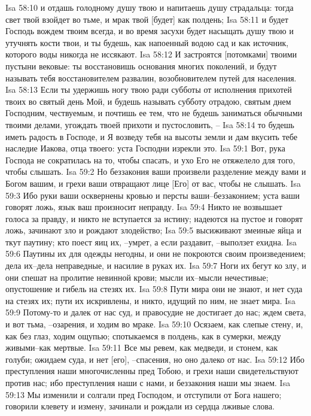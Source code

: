 Isa 58:10  и отдашь голодному душу твою и напитаешь душу страдальца: тогда свет твой взойдет во тьме, и мрак твой [будет] как полдень;
Isa 58:11  и будет Господь вождем твоим всегда, и во время засухи будет насыщать душу твою и утучнять кости твои, и ты будешь, как напоенный водою сад и как источник, которого воды никогда не иссякают.
Isa 58:12  И застроятся [потомками] твоими пустыни вековые: ты восстановишь основания многих поколений, и будут называть тебя восстановителем развалин, возобновителем путей для населения.
Isa 58:13  Если ты удержишь ногу твою ради субботы от исполнения прихотей твоих во святый день Мой, и будешь называть субботу отрадою, святым днем Господним, чествуемым, и почтишь ее тем, что не будешь заниматься обычными твоими делами, угождать твоей прихоти и пустословить, --
Isa 58:14  то будешь иметь радость в Господе, и Я возведу тебя на высоты земли и дам вкусить тебе наследие Иакова, отца твоего: уста Господни изрекли это.
Isa 59:1  Вот, рука Господа не сократилась на то, чтобы спасать, и ухо Его не отяжелело для того, чтобы слышать.
Isa 59:2  Но беззакония ваши произвели разделение между вами и Богом вашим, и грехи ваши отвращают лице [Его] от вас, чтобы не слышать.
Isa 59:3  Ибо руки ваши осквернены кровью и персты ваши--беззаконием; уста ваши говорят ложь, язык ваш произносит неправду.
Isa 59:4  Никто не возвышает голоса за правду, и никто не вступается за истину; надеются на пустое и говорят ложь, зачинают зло и рождают злодейство;
Isa 59:5  высиживают змеиные яйца и ткут паутину; кто поест яиц их, --умрет, а если раздавит, --выползет ехидна.
Isa 59:6  Паутины их для одежды негодны, и они не покроются своим произведением; дела их--дела неправедные, и насилие в руках их.
Isa 59:7  Ноги их бегут ко злу, и они спешат на пролитие невинной крови; мысли их--мысли нечестивые; опустошение и гибель на стезях их.
Isa 59:8  Пути мира они не знают, и нет суда на стезях их; пути их искривлены, и никто, идущий по ним, не знает мира.
Isa 59:9  Потому-то и далек от нас суд, и правосудие не достигает до нас; ждем света, и вот тьма, --озарения, и ходим во мраке.
Isa 59:10  Осязаем, как слепые стену, и, как без глаз, ходим ощупью; спотыкаемся в полдень, как в сумерки, между живыми--как мертвые.
Isa 59:11  Все мы ревем, как медведи, и стонем, как голуби; ожидаем суда, и нет [его], --спасения, но оно далеко от нас.
Isa 59:12  Ибо преступления наши многочисленны пред Тобою, и грехи наши свидетельствуют против нас; ибо преступления наши с нами, и беззакония наши мы знаем.
Isa 59:13  Мы изменили и солгали пред Господом, и отступили от Бога нашего; говорили клевету и измену, зачинали и рождали из сердца лживые слова.

